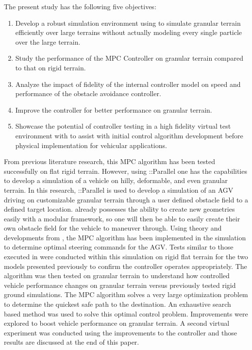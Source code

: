 \documentclass[12pt,onecolumn]{report}
\newcommand{\CHRONO}{{\sffamily{{Chrono}}}}
\newcommand{\ChronoParallel}{{\sffamily{Chrono}}::Parallel}
\begin{document}
The present study has the following five objectives:
\begin{enumerate}
\item
Develop a robust simulation environment using {\CHRONO} to simulate granular terrain efficiently over large terrains without actually modeling every single particle over the large terrain.
\item
Study the performance of the MPC Controller on granular terrain compared to that on rigid terrain.
\item
Analyze the impact of fidelity of the internal controller model on speed and performance of the obstacle avoidance controller.
\item
Improve the controller for better performance on granular terrain.
\item
Showcase the potential of controller testing in a high fidelity virtual test environment with {\CHRONO} to assist with initial control algorithm development before physical implementation for vehicular applications.
\end{enumerate}

From previous literature research, this MPC algorithm has been tested successfully on flat rigid terrain. However, using {\ChronoParallel} one has the capabilities to develop a simulation of a vehicle on hilly, deformable, and even granular terrain. In this research, {\ChronoParallel} is used to develop a simulation of an AGV driving on customizable granular terrain through a user defined obstacle field to a defined target location. {\CHRONO} already possesses the ability to create new geometries easily with a modular framework, so one will then be able to easily create their own obstacle field for the vehicle to maneuver through. Using theory and developments from \cite{ModelFidelity2016}, the MPC algorithm has been implemented in the simulation to determine optimal steering commands for the AGV. Tests similar to those executed in \cite{ModelFidelity2016} were conducted within this simulation on rigid flat terrain for the two models presented previously to confirm the controller operates appropriately. The algorithm was then tested on granular terrain to understand how controlled vehicle performance changes on granular terrain versus previously tested rigid ground simulations. The MPC algorithm solves a very large optimization problem to determine the quickest safe path to the destination. An exhaustive search based method was used to solve this optimal control problem. Improvements were explored to boost vehicle performance on granular terrain. A second virtual experiment was conducted using the improvements to the controller and those results are discussed at the end of this paper.
\end{document}
